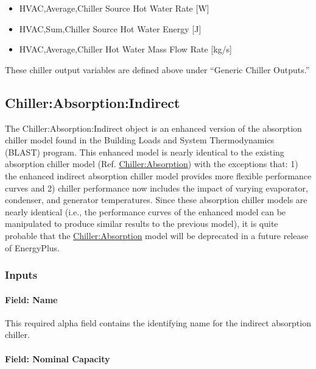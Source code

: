 \begin{itemize}
    \item
    HVAC,Average,Chiller Source Hot Water Rate {[}W{]}
    \item
    HVAC,Sum,Chiller Source Hot Water Energy {[}J{]}
    \item
    HVAC,Average,Chiller Hot Water Mass Flow Rate {[}kg/s{]}
\end{itemize}

These chiller output variables are defined above under ``Generic Chiller Outputs.''

\subsection{Chiller:Absorption:Indirect}\label{chillerabsorptionindirect}

The Chiller:Absorption:Indirect object is an enhanced version of the absorption chiller model found in the Building Loads and System Thermodynamics (BLAST) program. This enhanced model is nearly identical to the existing absorption chiller model (Ref. \hyperref[chillerabsorption]{Chiller:Absorption}) with the exceptions that: 1) the enhanced indirect absorption chiller model provides more flexible performance curves and 2) chiller performance now includes the impact of varying evaporator, condenser, and generator temperatures. Since these absorption chiller models are nearly identical (i.e., the performance curves of the enhanced model can be manipulated to produce similar results to the previous model), it is quite probable that the \hyperref[chillerabsorption]{Chiller:Absorption} model will be deprecated in a future release of EnergyPlus.

\subsubsection{Inputs}\label{inputs-1-033}

\paragraph{Field: Name}\label{field-name-1-032}

This required alpha field contains the identifying name for the indirect absorption chiller.

\paragraph{Field: Nominal Capacity}\label{field-nominal-capacity-1-001}

